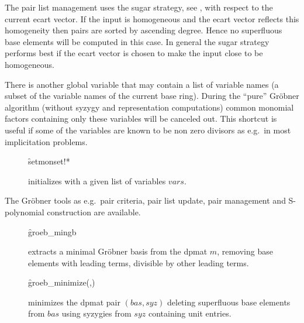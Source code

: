 The pair list management uses the sugar strategy, see \cite{Giovini:91},
with respect to the current ecart vector. If the input is homogeneous
and the ecart vector reflects this homogeneity then pairs are sorted
by ascending degree. Hence no superfluous base
elements will be computed in this case. In general the sugar strategy
performs best if the ecart vector is chosen to make the input close
to be homogeneous.

There is another global variable
 that may contain
a list of variable names (a subset of the variable names of the
current base ring). During the ``pure'' Gr\"obner algorithm (without syzygy
and representation computations) common monomial factors containing
only these variables will be canceled out. This shortcut is useful if
some of the variables are known to be non zero divisors as e.g.\ in
most implicitation problems.
\begin{description}

\item[]
  \begin{syntax}
    \f{setmonset!*} 
  \end{syntax}
  \hypertarget{procedure:SETMONSET!*}{}
initializes  with a given list of variables
$vars$.
\end{description}

The Gr\"obner tools as e.g.\ pair criteria, pair list update, pair
management and S-polynomial construction are available.
\begin{description}

\item[]
  \begin{syntax}
    \f{groeb\_mingb} 
  \end{syntax}
  \hypertarget{procedure:GROEB_MINGB}{}
extracts a minimal Gr\"obner basis from the dpmat $m$, removing base
elements with leading terms, divisible by other leading terms.

\item[]
  \begin{syntax}
    \f{groeb\_minimize}(,)
  \end{syntax}
  \hypertarget{procedure:GROEB_MINIMIZE}{}
minimizes the dpmat pair $(bas,syz)$ deleting superfluous base
elements from $bas$ using syzygies from $syz$ containing unit
entries.
\end{description}

